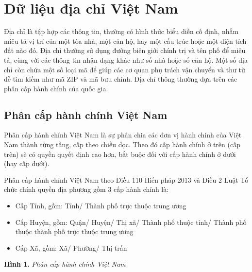\setcounter{chapter}{1}
\chapter{Dữ liệu địa chỉ Việt Nam}
Địa chỉ là tập hợp các thông tin, thường có hình thức biểu diễn cố định, nhằm miêu tả vị trí của một tòa nhà, một căn hộ, hay một cấu trúc hoặc một diện tích đất nào đó. Địa chỉ thường sử dụng đường biên giới chính trị và tên phố để miêu tả, cùng với các thông tin nhận dạng khác như số nhà hoặc số căn hộ. Một số địa chỉ còn chứa một số loại mã để giúp các cơ quan phụ trách vận chuyển và thư từ dễ tìm kiếm như mã ZIP và mã bưu chính. Địa chỉ thông thường dựa trên các phân cấp hành chính của quốc gia.
\section{Phân cấp hành chính Việt Nam}
Phân cấp hành chính Việt Nam là sự phân chia các đơn vị hành chính của Việt Nam thành từng tầng, cấp theo chiều dọc. Theo đó cấp hành chính ở trên (cấp trên) sẽ có quyền quyết định cao hơn, bắt buộc đối với cấp hành chính ở dưới (hay cấp dưới).

Phân cấp hành chính Việt Nam theo Điều 110 Hiến pháp 2013 và Điều 2 Luật Tổ chức chính quyền địa phương gồm 3 cấp hành chính là:
\begin{itemize}
    \item Cấp Tỉnh, gồm: Tỉnh/ Thành phố trực thuộc trung ương
    \item Cấp Huyện, gồm: Quận/ Huyện/ Thị xã/ Thành phố thuộc tỉnh/ Thành phố thuộc thành phố trực thuộc trung ương
    \item Cấp Xã, gồm: Xã/ Phường/ Thị trấn
\end{itemize}
\newpage
\begin{center}

\vspace*{1cm}
\textbf{Hình 1. } \textit{Phân cấp hành chính Việt Nam}
\end{center}

